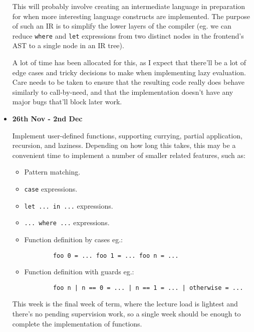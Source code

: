 \documentclass[12pt]{article}
\newcommand\haskell[1]{\texttt{#1}}
\begin{document}
\begin{itemize}
{    This will probably involve creating an intermediate language in preparation for when more interesting language
    constructs are implemented. The purpose of such an IR is to simplify the lower layers of the compiler (eg. we can
    reduce \haskell{where} and \haskell{let} expressions from two distinct nodes in the frontend's AST to a single node
    in an IR tree).

    A lot of time has been allocated for this, as I expect that there'll be a lot of edge cases and tricky decisions to
    make when implementing lazy evaluation. Care needs to be taken to ensure that the resulting code really does behave
    similarly to call-by-need, and that the implementation doesn't have any major bugs that'll block later work.

}
\item
{
    \textbf{26th Nov - 2nd Dec}

    Implement user-defined functions, supporting currying, partial application, recursion, and laziness. Depending on
    how long this takes, this may be a convenient time to implement a number of smaller related features, such as:
    
    \begin{itemize}
    \item Pattern matching.
    \item \haskell{case} expressions.
    \item \haskell{let ... in ...} expressions.
    \item \haskell{... where ...} expressions.
    \item
    {

        Function definition by cases eg.:
        \begin{verbatim}
        foo 0 = ... foo 1 = ... foo n = ...
        \end{verbatim}
    }
    \item
    {

        Function definition with guards eg.:
        \begin{verbatim}
        foo n | n == 0 = ... | n == 1 = ... | otherwise = ...
        \end{verbatim}
    }
    \end{itemize}

    This week is the final week of term, where the lecture load is lightest and there's no pending supervision work, so
    a single week should be enough to complete the implementation of functions.

}
\end{itemize}
\end{document}

